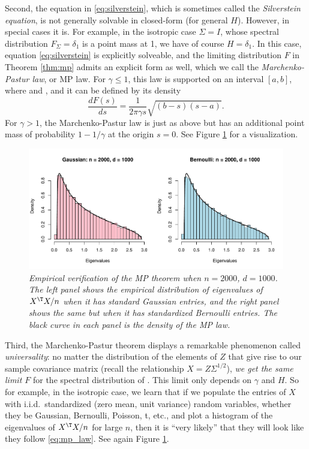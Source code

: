 \documentclass{article}
\begin{document}
Second, the equation in \eqref{eq:silverstein}, which is sometimes called the
\emph{Silverstein equation}, is not generally solvable in closed-form (for
general $H$). However, in special cases it is. For example, in the isotropic
case $\Sigma = I$, whose spectral distribution $F_\Sigma = \delta_1$ is a point
mass at 1, we have of course $H = \delta_1$. In this case, equation
\eqref{eq:silverstein} is explicitly solveable, and the limiting distribution
$F$ in Theorem \ref{thm:mp} admits an explicit form as well, which we call the
\emph{Marchenko-Pastur law}, or MP law. For $\gamma \leq 1$, this law is 
supported on an interval $[a,b]$, where  and
, and it can be defined by its density     
\begin{equation}
\label{eq:mp_law}
\frac{dF(s)}{ds} = \frac{1}{2 \pi \gamma s} \sqrt{(b-s)(s-a)}.
\end{equation}
For $\gamma > 1$, the Marchenko-Pastur law is just as above but has an
additional point mass of probability $1-1/\gamma$ at the origin $s=0$. See
Figure \ref{fig:mp} for a visualization.

\begin{figure}[htb]
\centering
\includegraphics[width=\textwidth]{mp.pdf}
\caption{\it Empirical verification of the MP theorem when $n=2000$,
  $d=1000$. The left panel shows the empirical distribution of eigenvalues of
  $X^\T X/n$ when it has standard Gaussian entries, and the right panel shows 
  the same but when it has standardized Bernoulli entries. The black curve in
  each panel is the density of the MP law.}    
\label{fig:mp}
\end{figure}

Third, the Marchenko-Pastur theorem displays a remarkable phenomenon called
\emph{universality}: no matter the distribution of the elements of $Z$ that give
rise to our sample covariance matrix  (recall the
relationship $X = Z \Sigma^{1/2}$), \emph{we get the same limit $F$} for the
spectral distribution of \smash{$\hSigma$}. This limit only depends on $\gamma$
and $H$. So for example, in the isotropic case, we learn that if we populate the
entries of $X$ with i.i.d.\ standardized (zero mean, unit variance) random
variables, whether they be Gaussian, Bernoulli, Poisson, t, etc., and plot a
histogram of the eigenvalues of $X^\T X/n$ for large $n$, then it is ``very
likely'' that they will look like they follow \eqref{eq:mp_law}. See again
Figure \ref{fig:mp}.  
\end{document}
